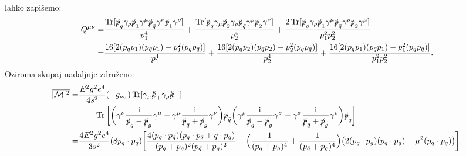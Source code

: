 \documentclass[11pt]{article}
\newcommand{\Tr}{\mathop{\rm Tr}\nolimits}
\newcommand{\ii}{\mathrm{i}}
\begin{document}
lahko zapišemo:
\begin{equation}
       \begin{split}
              Q^{\mu \nu} =& 
              \frac{\Tr [\slashed{p}_q \gamma_\rho \slashed{p}_1 \gamma^\mu \slashed{p}_{\bar{q}} \gamma^\nu \slashed{p}_1 \gamma^\rho]}{p_1^4} +
              \frac{\Tr [\slashed{p}_q \gamma_\mu \slashed{p}_2 \gamma_\rho \slashed{p}_{\bar{q}} \gamma^\rho \slashed{p}_2 \gamma^\nu]}{p_2^4} +
              \frac{2 \Tr [\slashed{p}_q \gamma_\rho \slashed{p}_1 \gamma^\mu \slashed{p}_{\bar{q}} \gamma^\rho \slashed{p}_2 \gamma^\mu]}{p_1^2 p_2^2} \\
              =&
              \frac{16 [2(p_q p_1) (p_{\bar{q}} p_1) - p_1^2(p_q p_{\bar{q}})]}{p_1^4} +
              \frac{16 [2(p_q p_2) (p_{\bar{q}} p_2) - p_2^2(p_q p_{\bar{q}})]}{p_2^4} +
              \frac{16 [2(p_q p_1) (p_{\bar{q}} p_1) - p_1^2(p_q p_{\bar{q}})]}{p_1^2 p_2^2}.
       \end{split}
\end{equation}
Oziroma skupaj nadaljnje združeno:
\begin{equation}
       \begin{split}
              \overline{| \mathcal{M} |^2} =&  
              \frac{E^2 g^2 e^4}{4 s^2} (-g_{\nu \sigma})
              \Tr [\gamma_\mu \slashed{k}_+ \gamma_\rho \slashed{k}_-] \\
              & \quad \quad \Tr
              \bigg[ \bigg( \gamma ^\nu \frac{\ii}{\slashed{p}_q -
              \slashed{p}_g} \gamma^\mu - \gamma^\mu \frac{\ii}{\slashed{p}_{\bar{q}} + \slashed{p}_g} \gamma ^\nu \bigg)
              \slashed{p}_{\bar{q}}
              \bigg( \gamma ^\rho \frac{\ii}{\slashed{p}_q - \slashed{p}_g} \gamma^\sigma - 
              \gamma^\sigma \frac{\ii}{\slashed{p}_{\bar{q}} + \slashed{p}_g} \gamma ^\rho \bigg)
              \slashed{p}_q \bigg]
              \\
              =& \frac{4 E^2 g^2 e^4}{3s^2} (8p_q \cdot p_{\bar{q}})
              \bigg [
              \frac{4(p_q \cdot p_{\bar{q}})(p_q \cdot p_{\bar{q}} + q\cdot p_g)}{(p_q + p_g)^2(p_{\bar{q}}+p_g)^2}
              +
              \Big(
                     \frac{1}{(p_q + p_g)^4} + \frac{1}{(p_{\bar{q}} + p_g)^4}
              \Big)
              \big (2 (p_q \cdot p_g)(p_{\bar{q}} \cdot p_g) - \mu^2 (p_q \cdot p_{\bar{q}}) \big)
              \bigg].
       \end{split}
\end{equation}
\end{document}
